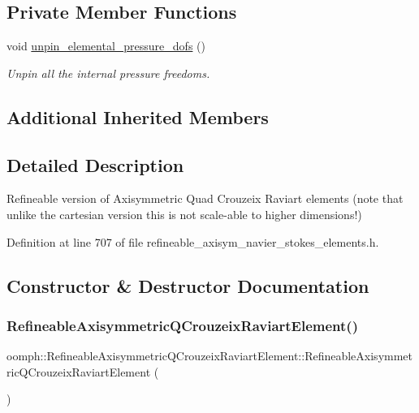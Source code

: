 \subsection*{Private Member Functions}
\begin{DoxyCompactItemize}
\item 
void \hyperlink{classoomph_1_1RefineableAxisymmetricQCrouzeixRaviartElement_a03db4e96e84be516b30ee13ec075a939}{unpin\+\_\+elemental\+\_\+pressure\+\_\+dofs} ()
\begin{DoxyCompactList}\small\item\em Unpin all the internal pressure freedoms. \end{DoxyCompactList}\end{DoxyCompactItemize}
\subsection*{Additional Inherited Members}


\subsection{Detailed Description}
Refineable version of Axisymmetric Quad Crouzeix Raviart elements (note that unlike the cartesian version this is not scale-\/able to higher dimensions!) 

Definition at line 707 of file refineable\+\_\+axisym\+\_\+navier\+\_\+stokes\+\_\+elements.\+h.



\subsection{Constructor \& Destructor Documentation}
\mbox{\label{classoomph_1_1RefineableAxisymmetricQCrouzeixRaviartElement_a170435912237a7b7a7b79f89d18da149}} 
\subsubsection{\texorpdfstring{Refineable\+Axisymmetric\+Q\+Crouzeix\+Raviart\+Element()}{RefineableAxisymmetricQCrouzeixRaviartElement()}}
{\footnotesize\ttfamily oomph\+::\+Refineable\+Axisymmetric\+Q\+Crouzeix\+Raviart\+Element\+::\+Refineable\+Axisymmetric\+Q\+Crouzeix\+Raviart\+Element (\begin{DoxyParamCaption}{ }\end{DoxyParamCaption})\hspace{0.3cm}{\ttfamily [inline]}}



